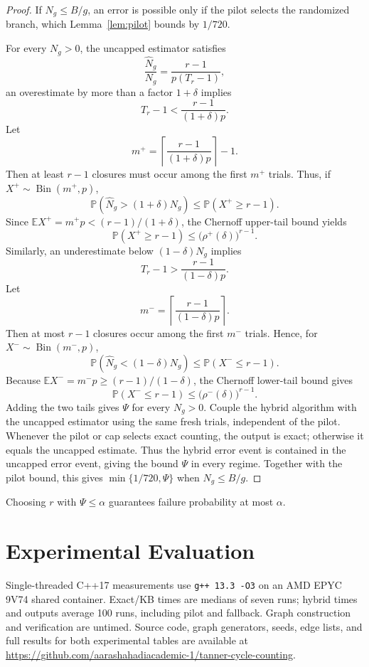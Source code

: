 \documentclass[conference]{IEEEtran}
\newcommand{\E}{\mathbb{E}}
\newcommand{\Prb}{\mathbb{P}}
\begin{document}
\begin{proof}
If $N_g\le B/g$, an error is possible only if the pilot selects the randomized
branch, which Lemma~\ref{lem:pilot} bounds by $1/720$.

For every $N_g>0$, the uncapped estimator satisfies
\[
\frac{\widehat N_g}{N_g}
=
\frac{r-1}{p(T_r-1)},
\]
an overestimate by more than a factor $1+\delta$ implies
\[
T_r-1<\frac{r-1}{(1+\delta)p}.
\]
Let
\[
m^+=\left\lceil\frac{r-1}{(1+\delta)p}\right\rceil-1.
\]
Then at least $r-1$ closures must occur among the first $m^+$ trials.
Thus, if $X^+\sim\operatorname{Bin}(m^+,p)$,
\[
\Prb\!\left(\widehat N_g>(1+\delta)N_g\right)
\le \Prb(X^+\ge r-1).
\]
Since $\E X^+=m^+p<(r-1)/(1+\delta)$, the Chernoff upper-tail bound yields
\[
\Prb(X^+\ge r-1)
\le
\bigl(\rho^+(\delta)\bigr)^{r-1}.
\]
Similarly, an underestimate below $(1-\delta)N_g$ implies
\[
T_r-1>\frac{r-1}{(1-\delta)p}.
\]
Let
\[
m^-=\left\lceil\frac{r-1}{(1-\delta)p}\right\rceil.
\]
Then at most $r-1$ closures occur among the first $m^-$ trials. Hence, for
$X^-\sim\operatorname{Bin}(m^-,p)$,
\[
\Prb\!\left(\widehat N_g<(1-\delta)N_g\right)
\le \Prb(X^-\le r-1).
\]
Because $\E X^-=m^-p\ge(r-1)/(1-\delta)$, the Chernoff lower-tail bound gives
\[
\Prb(X^-\le r-1)
\le
\bigl(\rho^-(\delta)\bigr)^{r-1}.
\]
Adding the two tails gives $\Psi$ for every $N_g>0$. Couple the hybrid
algorithm with the uncapped estimator using the same fresh trials,
independent of the pilot. Whenever the pilot or cap selects exact
counting, the output is exact; otherwise it equals the uncapped estimate.
Thus the hybrid error event is contained in the uncapped error event,
giving the bound $\Psi$ in every regime. Together with the pilot bound,
this gives $\min\{1/720,\Psi\}$ when $N_g\le B/g$.
\end{proof}

Choosing $r$ with $\Psi\le\alpha$ guarantees failure probability
at most $\alpha$.

\section{Experimental Evaluation}\label{sec:experiments}
Single-threaded C++17 measurements use \texttt{g++ 13.3 -O3} on an
AMD EPYC 9V74 shared container. Exact/KB times are medians of seven runs;
hybrid times and outputs average 100 runs, including pilot and fallback.
Graph construction and verification are untimed. Source code, graph generators, seeds, edge lists, and full results
for both experimental tables are available at
\url{https://github.com/aarashahadiacademic-1/tanner-cycle-counting}.
\end{document}
